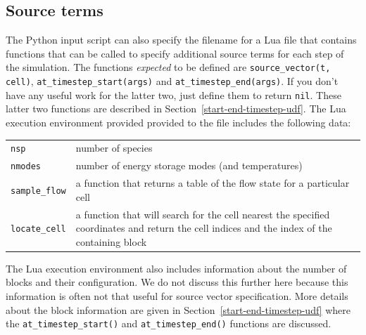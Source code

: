 \subsection{Source terms}
\label{source-terms-udf}
%
The Python input script can also specify the filename for a Lua file that contains functions
that can be called to specify additional source terms for each step of the simulation.
The functions \textit{expected} to be defined are \texttt{source\_vector(t, cell)},
\texttt{at\_timestep\_start(args)} and \texttt{at\_timestep\_end(args)}.
If you don't have any useful work for the latter two, just define them to return \texttt{nil}.
These latter two functions are described in Section~\ref{start-end-timestep-udf}.
The Lua execution environment provided provided to the file includes the following data:\\
\begin{tabular}{ll}
 \texttt{nsp} & number of species \\
 \texttt{nmodes} & number of energy storage modes (and temperatures) \\
 \texttt{sample\_flow} & \parbox{12cm}{a function that returns a table of 
                                      the flow state for a particular cell} \\
 \texttt{locate\_cell} & \parbox{12cm}{a function that will search for the cell nearest 
                                      the specified coordinates and return the cell indices
                                      and the index of the containing block} 
\end{tabular}
The Lua execution environment also includes information about the number of blocks
and their configuration.
We do not discuss this further here because this information is often not
that useful for source vector specification.
More details about the block information are given in Section~\ref{start-end-timestep-udf}
where the \texttt{at\_timestep\_start()} and \texttt{at\_timestep\_end()}
functions are discussed.

